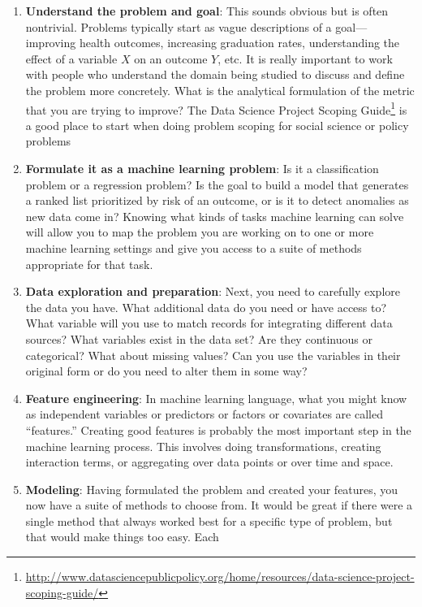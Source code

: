 \documentclass[]{krantz}
\begin{document}
\begin{enumerate}
\def\labelenumi{\arabic{enumi}.}
\item
  \textbf{Understand the problem and goal}: This sounds obvious but is
  often nontrivial. Problems typically start as vague descriptions of a
  goal---improving health outcomes, increasing graduation rates,
  understanding the effect of a variable \(X\) on an outcome \(Y\), etc.
  It is really important to work with people who understand the domain
  being studied to discuss and define the problem more concretely. What
  is the analytical formulation of the metric that you are trying to
  improve? The Data Science Project Scoping Guide\footnote{\url{http://www.datasciencepublicpolicy.org/home/resources/data-science-project-scoping-guide/}}
  is a good place to start when doing problem scoping for social science
  or policy problems
\item
  \textbf{Formulate it as a machine learning problem}: Is it a
  classification problem or a regression problem? Is the goal to build a
  model that generates a ranked list prioritized by risk of an outcome,
  or is it to detect anomalies as new data come in? Knowing what kinds
  of tasks machine learning can solve will allow you to map the problem
  you are working on to one or more machine learning settings and give
  you access to a suite of methods appropriate for that task.
\item
  \textbf{Data exploration and preparation}: Next, you need to carefully
  explore the data you have. What additional data do you need or have
  access to? What variable will you use to match records for integrating
  different data sources? What variables exist in the data set? Are they
  continuous or categorical? What about missing values? Can you use the
  variables in their original form or do you need to alter them in some
  way?
\item
  \textbf{Feature engineering}: In machine learning language, what you
  might know as independent variables or predictors or factors or
  covariates are called ``features.'' Creating good features is probably
  the most important step in the machine learning process. This involves
  doing transformations, creating interaction terms, or aggregating over
  data points or over time and space.
\item
  \textbf{Modeling}: Having formulated the problem and created your
  features, you now have a suite of methods to choose from. It would be
  great if there were a single method that always worked best for a
  specific type of problem, but that would make things too easy. Each

\end{enumerate}
\end{document}
